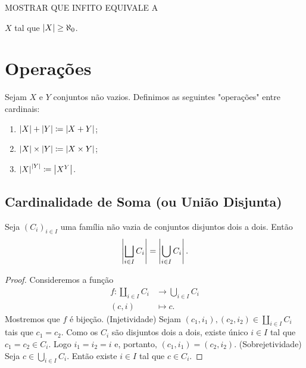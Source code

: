 	MOSTRAR QUE INFITO EQUIVALE A

$X$ tal que $\left\vert{X}\right\vert \geq \aleph_0$.

\section{Operações}

\begin{defi}
	Sejam $X$ e $Y$ conjuntos não vazios. Definimos as seguintes "operações" entre cardinais:
	\begin{enumerate}
	\item $\card{X} + \card{Y} \coloneqq \card{X + Y}$;
	\item $\card{X} \times \card{Y} \coloneqq \card{X \times Y}$;
	\item $\card{X}^{\card{Y}} \coloneqq \card{X^Y}$.
	\end{enumerate}
\end{defi}

\subsection{Cardinalidade de Soma (ou União Disjunta)}

\begin{prop}
\label{conj:prop.un.dis}
Seja $(C_i)_{i \in I}$ uma família não vazia de conjuntos disjuntos dois a dois. Então
	\begin{equation*}
	\left\vert{\bigsqcup_{i \in I} C_i}\right\vert = \left\vert{\bigcup_{i \in I} C_i}\right\vert.
	\end{equation*}
\end{prop}
\begin{proof}
Consideremos a função
	\begin{align*}
	f: \coprod_{i \in I} C_i &\to \bigcup_{i \in I} C_i \\
			(c,i) &\mapsto c.
	\end{align*}
Mostremos que $f$ é bijeção. (Injetividade) Sejam $(c_1,i_1),(c_2,i_2) \in \coprod_{i \in I} C_i$ tais que $c_1=c_2$. Como os $C_i$ são disjuntos dois a dois, existe único $i \in I$ tal que $c_1=c_2 \in C_i$. Logo $i_1=i_2=i$ e, portanto, $(c_1,i_1)=(c_2,i_2)$. (Sobrejetividade) Seja $c \in \bigcup_{i \in I} C_i$. Então existe $i \in I$ tal que $c \in C_i$.
\end{proof}

